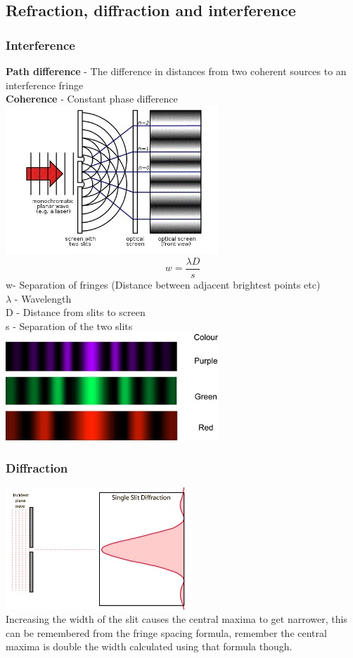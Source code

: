 \documentclass[12pt]{article}
\begin{document}
\subsection{Refraction, diffraction and interference}
\subsubsection{Interference}
\textbf{Path difference} - The difference in distances from two coherent sources to an interference fringe\\
\textbf{Coherence} - Constant phase difference\\
\includegraphics[width=8cm]{Interference.jpg}
$$w=\frac{\lambda D}{s}$$
w- Separation of fringes (Distance between adjacent brightest points etc)\\
$\lambda$ - Wavelength\\
D - Distance from slits to screen\\
s - Separation of the two slits\\
\includegraphics[width=8cm]{Diffraction_Colours.png}
\subsubsection{Diffraction}
\includegraphics[width=7cm]{Diffraction.png}\\
Increasing the width of the slit causes the central maxima to get narrower, this can be remembered from the fringe spacing formula, remember the central maxima is double the width calculated using that formula though.
\end{document}
